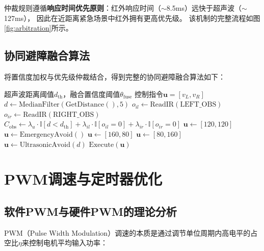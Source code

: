 \documentclass[12pt,a4paper]{ctexart}
\begin{document}
仲裁规则遵循\textbf{响应时间优先原则}：红外响应时间（$\sim$8.5ms）远快于超声波（$\sim$127ms），
因此在近距离紧急场景中红外拥有更高优先级。
该机制的完整流程如图\ref{fig:arbitration}所示。

\subsection{协同避障融合算法}

将置信度加权与优先级仲裁结合，得到完整的协同避障融合算法如下：

\begin{algorithm}[H]
\caption{多传感器协同避障融合算法}
\label{alg:fusion}
\begin{algorithmic}[1]
\Require 超声波距离阈值$d_{\text{th}}$，融合置信度阈值$\theta_{\text{fuse}}$
\Ensure 控制指令$\mathbf{u} = [v_L, v_R]$
\Loop
    \State $d \gets \text{MedianFilter}(\text{GetDistance}(), 5)$ 
    \State $o_{il} \gets \text{ReadIR}(\text{LEFT\_OBS})$
    \State $o_{ir} \gets \text{ReadIR}(\text{RIGHT\_OBS})$
    \State {}
    \State $C_{\text{obs}} \gets \lambda_u \cdot \mathbb{I}[d < d_{\text{th}}] + \lambda_{il} \cdot \mathbb{I}[o_{il}=0] + \lambda_{ir} \cdot \mathbb{I}[o_{ir}=0]$
        \State $\mathbf{u} \gets [120, 120]$ 
    \Else
            \State $\mathbf{u} \gets \text{EmergencyAvoid}()$ 
            \State $\mathbf{u} \gets [160, 80]$ 
            \State $\mathbf{u} \gets [80, 160]$ 
            \State $\mathbf{u} \gets \text{UltrasonicAvoid}(d)$ 
        \EndIf
    \EndIf
    \State $\text{Execute}(\mathbf{u})$
\EndLoop
\end{algorithmic}
\end{algorithm}

\section{PWM调速与定时器优化}

\subsection{软件PWM与硬件PWM的理论分析}

PWM（Pulse Width Modulation）调速的本质是通过调节单位周期内高电平的占空比$\eta$来控制电机平均输入功率：
\end{document}
